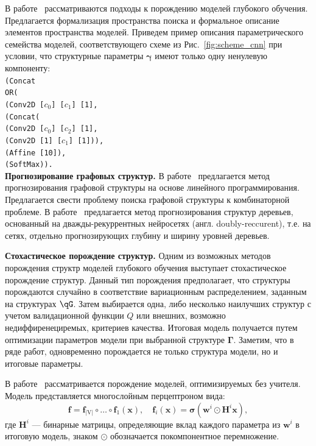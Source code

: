 В работе~\cite{search_space} рассматриваются подходы к порождению моделей глубокого обучения. Предлагается формализация пространства поиска и формальное описание элементов  пространства моделей. Приведем пример описания параметрического семейства моделей, соответствующего схеме из Рис.~\ref{fig:scheme_cnn} при условии, что структурные параметры $\boldsymbol{\gamma}$ имеют только одну ненулевую компоненту:\\
\texttt{(Concat\\
\text{\quad}OR(\\
\text{\quad\quad}(Conv2D [$c_0$] [$c_1$] [1],\\
\text{\quad\quad}(Concat(\\
\text{\quad\quad\quad}(Conv2D [$c_0$] [$c_2$] [1],\\
\text{\quad\quad\quad}(Conv2D [1] [$c_1$] [1])),\\
\text{\quad}(Affine [10]),\\
\text{\quad}(SoftMax)).} \\



\textbf{Прогнозирование графовых структур. }
В работе~\cite{jaakkola2010learning} предлагается метод прогнозирования графовой структуры на основе линейного программирования. Предлагается свести проблему поиска графовой структуры к комбинаторной проблеме.
В работе~\cite{double_rnn} предлагается метод прогнозирования структур деревьев, основанный на дважды-рекуррентных нейросетях (англ. doubly-reccurent), т.е. на сетях, отдельно прогнозирующих глубину и ширину уровней деревьев.

\par{\textbf{Стохастическое порождение структур. }}
Одним из возможных методов порождения структр моделей глубокого обучения выступает стохастическое порождение структур.
Данный тип порождения предполагает, что структуры порождаются случайно в соответствие  вариационным распределением, заданным на структурах $\qG$. Затем выбирается одна, либо несколько наилучших структур с учетом валидационной функции $Q$ или внешних, возможно недиффиренециремых, критериев качества. Итоговая модель получается путем оптимизации параметров модели при выбранной структуре $\boldsymbol{\Gamma}$. 
Заметим, что в ряде работ, одновременно порождается не только структура модели, но и итоговые параметры.

В работе~\cite{cib} рассматривается порождение моделей, оптимизируемых без учителя. Модель представляется многослойным перцептроном вида:
\[
    \mathbf{f} = \mathbf{f}_\text{|V|} \circ \dots \circ \mathbf{f}_1 (\mathbf{x}), \quad \mathbf{f}_i(\mathbf{x}) = \boldsymbol{\sigma}(\mathbf{w}^i \odot \mathbf{H}^i \mathbf{x}),
\]
где $\mathbf{H}^i$ --- бинарные матрицы, определяющие вклад каждого параметра из $\mathbf{w}^i$ в итоговую модель, знаком $\odot$  обозначается покомпонентное перемножение. 

